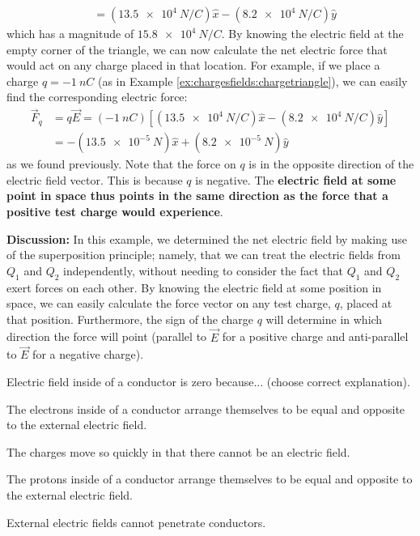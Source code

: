 \begin{example}
\begin{align*}
&=(\SI{13.5e4}{N/C})\hat x-(\SI{8.2e4}{N/C})\hat y
\end{align*}
which has a magnitude of $\SI{15.8e4}{N/C}$. By knowing the electric field at the empty corner of the triangle, we can now calculate the net electric force that would act on any charge placed in that location. For example, if we place a charge $q=\SI{-1}{nC}$ (as in Example \ref{ex:chargesfields:chargetriangle}), we can easily find the corresponding electric force:
\begin{align*}
\vec F_q &= q\vec E=(\SI{-1}{nC})\left[ (\SI{13.5e4}{N/C})\hat x-(\SI{8.2e4}{N/C})\hat y \right]\\
&=-(\SI{13.5e-5}{N})\hat x+(\SI{8.2e-5}{N})\hat y
\end{align*}
as we found previously. Note that the force on $q$ is in the opposite direction of the electric field vector. This is because $q$ is negative. The \textbf{electric field at some point in space thus points in the same direction as the force that a positive test charge would experience}.

\textbf{Discussion:} In this example, we determined the net electric field by making use of the superposition principle; namely, that we can treat the electric fields from $Q_1$ and $Q_2$ independently, without needing to consider the fact that $Q_1$ and $Q_2$ exert forces on each other. By knowing the electric field at some position in space, we can easily calculate the force vector on any test charge, $q$, placed at that position. Furthermore, the sign of the charge $q$ will determine in which direction the force will point (parallel to $\vec E$ for a positive charge and anti-parallel to $\vec E$ for a negative charge).
\end{example}

\begin{checkpoint}\label{cp:chargesfields:conductorield}
	\begin{MCquestion}{Electric field inside of a conductor is zero because... (choose correct explanation).}
		\item The electrons inside of a conductor arrange themselves to be equal and opposite to the external electric field. \correct
		\item The charges move so quickly in that there cannot be an electric field.
		\item The protons inside of a conductor arrange themselves to be equal and opposite to the external electric field.
		\item External electric fields cannot penetrate conductors.
	\end{MCquestion}
\end{checkpoint}

